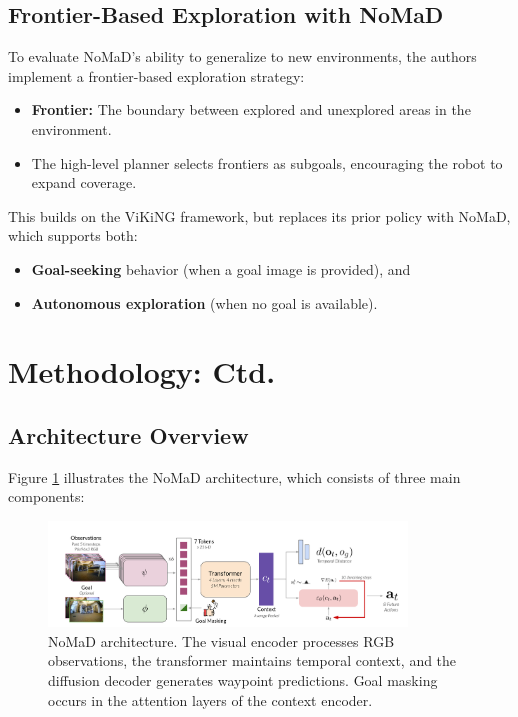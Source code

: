\documentclass[12pt]{article}
\begin{document}
\begin{appendices}
\subsection*{Frontier-Based Exploration with NoMaD}
To evaluate NoMaD's ability to generalize to new environments, the authors implement a frontier-based exploration strategy:
\begin{itemize} 
    \item \textbf{Frontier:} The boundary between explored and unexplored areas in the environment. 
    \item The high-level planner selects frontiers as subgoals, encouraging the robot to expand coverage. 
\end{itemize}
This builds on the ViKiNG framework, but replaces its prior policy with NoMaD, which supports both: 
\begin{itemize} 
    \item \textbf{Goal-seeking} behavior (when a goal image is provided), and 
    \item \textbf{Autonomous exploration} (when no goal is available). 
\end{itemize}

\section{Methodology: Ctd.}
\label{app:method_ctd}
\subsection*{Architecture Overview}
\label{subsec:architecture}
Figure \ref{fig:nomad_architecture} illustrates the NoMaD architecture, which consists of three main components:

\begin{figure}[H]
    \centering
    \includegraphics[width=0.85\textwidth]{nomad_diagram.png}
    \caption{NoMaD architecture. The visual encoder processes RGB observations, the transformer maintains temporal context, and the diffusion decoder generates waypoint predictions. Goal masking occurs in the attention layers of the context encoder.}
    \label{fig:nomad_architecture}
\end{figure}



\end{appendices}
\end{document}
